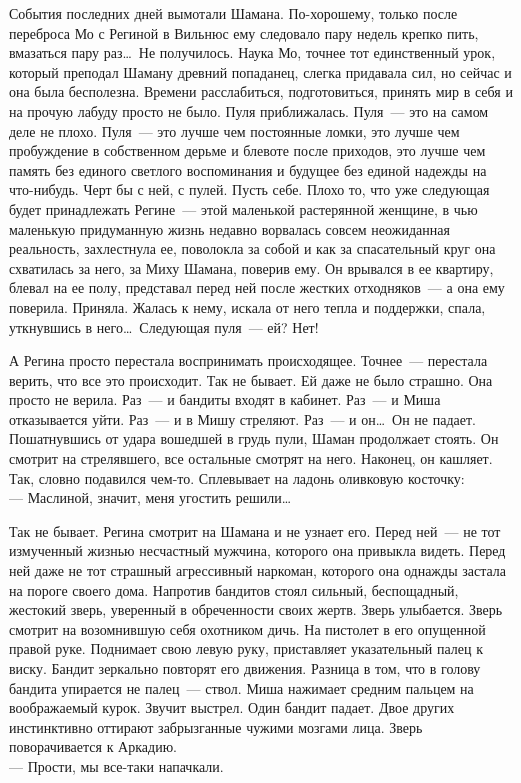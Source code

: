 События последних дней вымотали Шамана. По-хорошему, только после переброса Мо 
с Региной в Вильнюс ему следовало пару недель крепко пить, вмазаться пару 
раз\ldots\ Не получилось. Наука Мо, точнее тот единственный урок, который преподал Шаману 
древний попаданец, слегка придавала сил, но сейчас и она была бесполезна. 
Времени расслабиться, подготовиться, принять мир в себя и на прочую лабуду 
просто не было. Пуля приближалась. Пуля~--- это на самом деле не плохо. 
Пуля~--- это лучше чем постоянные ломки, это лучше чем пробуждение в собственном дерьме и 
блевоте после приходов, это лучше чем память без единого светлого воспоминания 
и будущее без единой надежды на что-нибудь. Черт бы с ней, с пулей. Пусть себе. 
Плохо то, что уже следующая будет принадлежать Регине~--- этой маленькой 
растерянной женщине, в чью маленькую придуманную жизнь недавно ворвалась совсем 
неожиданная реальность, захлестнула ее, поволокла за собой и как за 
спасательный круг она схватилась за него, за Миху Шамана, поверив ему. Он врывался в ее 
квартиру, блевал на ее полу, представал перед ней после жестких отходняков~--- 
а она ему поверила. Приняла. Жалась к нему, искала от него тепла и поддержки, 
спала, уткнувшись в него\ldots\ Следующая пуля~--- ей? Нет!

А Регина просто перестала воспринимать происходящее. Точнее~--- перестала 
верить, что все это происходит. Так не бывает. Ей даже не было страшно. Она просто не 
верила. Раз~--- и бандиты входят в кабинет. Раз~--- и Миша отказывается уйти. 
Раз~--- и в Мишу стреляют. Раз~--- и он\ldots\ Он не падает. Пошатнувшись от удара 
вошедшей в грудь пули, Шаман продолжает стоять. Он смотрит на стрелявшего, все остальные 
смотрят на него. Наконец, он кашляет. Так, словно подавился чем-то. Сплевывает 
на ладонь оливковую косточку:\\
--- Маслиной, значит, меня угостить решили\ldots

Так не бывает. Регина смотрит на Шамана и не узнает его. Перед ней~--- не тот 
измученный жизнью несчастный мужчина, которого она привыкла видеть. Перед ней 
даже не тот страшный агрессивный наркоман, которого она однажды застала на 
пороге своего дома. Напротив бандитов стоял сильный, беспощадный, жестокий 
зверь, уверенный в обреченности своих жертв. Зверь улыбается. Зверь смотрит на 
возомнившую себя охотником дичь. На пистолет в его опущенной правой руке. 
Поднимает свою левую руку, приставляет указательный палец к виску. Бандит 
зеркально повторят его движения. Разница в том, что в голову бандита упирается 
не палец~--- ствол. Миша нажимает средним пальцем на воображаемый курок. Звучит 
выстрел. Один бандит падает. Двое других инстинктивно оттирают забрызганные 
чужими мозгами лица. Зверь поворачивается к Аркадию.\\
--- Прости, мы все-таки напачкали.

